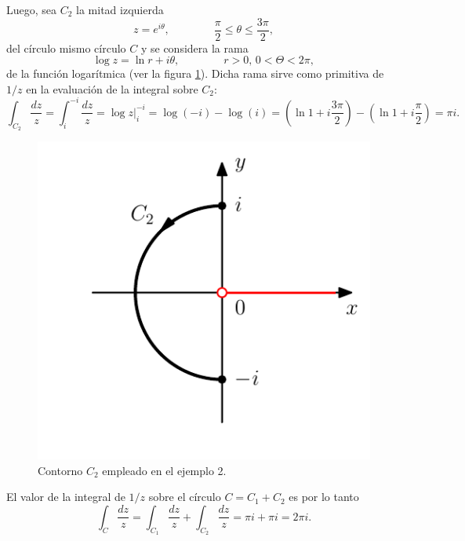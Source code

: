 \documentclass[a4paper]{report}
\begin{document}
Luego, sea \(C_2\) la mitad izquierda 
\[
 z=e^{i\theta},
 \qquad\qquad 
 \frac{\pi}{2}\leq\theta\leq\frac{3\pi}{2},
\]
del círculo mismo círculo \(C\) y se considera la rama
\[
 \log z=\ln r+i\theta,
 \qquad\qquad 
 r>0,\,0<\Theta<2\pi,
\]
de la función logarítmica (ver la figura \ref{fig:example_48_03_C2}). Dicha rama sirve como primitiva de \(1/z\) en la evaluación de la integral sobre \(C_2\):
\[
 \int_{C_2}\frac{dz}{z}=\int_{i}^{-i}\frac{dz}{z}=\log z\bigg|_{i}^{-i}=\log(-i)-\log(i)
 =\left(\ln1+i\frac{3\pi}{2}\right)-\left(\ln1+i\frac{\pi}{2}\right)=\pi i.
\]
\begin{figure}[!htb]
  \begin{minipage}[c]{0.35\textwidth}
    \includegraphics[width=\textwidth]{figuras/example_48_03_C2.pdf}
  \end{minipage}\hfill
  \begin{minipage}[c]{0.55\textwidth}
    \caption{
        Contorno \(C_2\) empleado en el ejemplo 2.
    }\label{fig:example_48_03_C2}
  \end{minipage}
\end{figure}

El valor de la integral de \(1/z\) sobre el círculo \(C=C_1 + C_2\) es por lo tanto
\[
 \int_{C}\frac{dz}{z}=\int_{C_1}\frac{dz}{z}+\int_{C_2}\frac{dz}{z}=\pi i+\pi i=2\pi i.
\]
\end{document}
